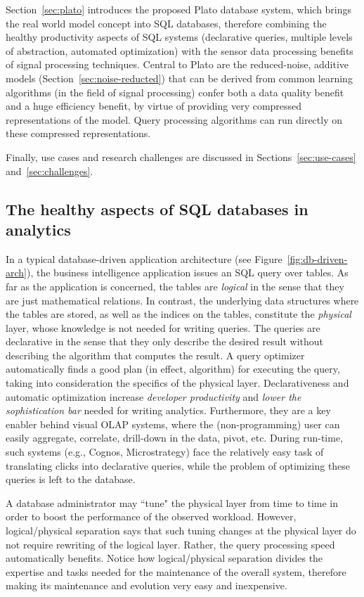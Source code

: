Section~\ref{sec:plato} introduces the proposed Plato database system, which brings the real world model concept into SQL databases, therefore combining the healthy productivity aspects of SQL systems (declarative queries, multiple levels of abstraction, automated optimization) with the sensor data processing benefits of signal processing techniques. Central to Plato  are the reduced-noise, additive models (Section~\ref{sec:noise-reducted}) that can be derived from common learning algorithms (in the field of signal processing) confer both a data quality benefit and a huge efficiency benefit, by virtue of providing very compressed representations of the model. Query processing algorithms can run directly on these compressed representations.

Finally, use cases and research challenges are discussed in Sections~\ref{sec:use-cases} and~\ref{sec:challenges}.
 
\subsection{The healthy aspects of SQL databases in analytics}
\label{sec:healthy-aspects}

In a typical database-driven application architecture (see Figure~\ref{fig:db-driven-arch}), the business intelligence application issues an SQL query over tables. As far as the application is concerned, the tables are {\em logical} in the sense that they are just mathematical relations. In contrast, the underlying data structures where the tables are stored, as well as the indices on the tables, constitute the {\em physical} layer, whose knowledge is not needed for writing queries. The queries are declarative in the sense that they only describe the desired result without describing the algorithm that computes the result. A query optimizer automatically finds a good plan (in effect, algorithm) for executing the query, taking into consideration the specifics of the physical layer. Declarativeness and automatic optimization increase {\em developer productivity} and {\em lower the sophistication bar} needed for writing analytics. Furthermore, they are a key enabler behind visual OLAP systems, where the (non-programming) user can easily aggregate, correlate, drill-down in the data, pivot, etc. During run-time, such systems (e.g., Cognos, Microstrategy) face the relatively easy task of translating clicks into declarative queries, while the problem of optimizing these queries is left to the database.

A database administrator may ``tune" the physical layer from time to time in order to boost the performance of the observed workload. However, logical/physical separation says that such tuning changes at the physical layer do not require rewriting of the logical layer. Rather, the query processing speed automatically benefits. Notice how logical/physical separation divides the expertise and tasks needed for the maintenance of the overall system, therefore making its maintenance and evolution very easy and inexpensive.

